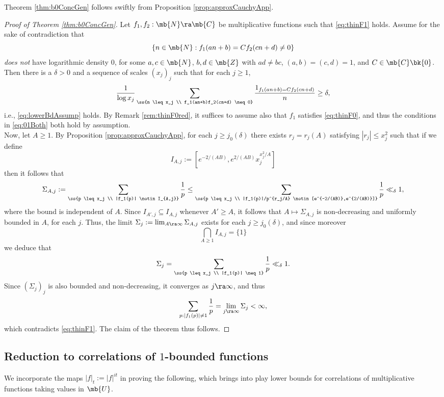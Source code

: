 Theorem \ref{thm:b0ConcGen} follows swiftly from Proposition \ref{prop:approxCauchyApp}.
\begin{proof}[Proof of Theorem \ref{thm:b0ConcGen}]
Let $f_1,f_2: \mb{N} \ra \mb{C}$ be multiplicative functions such that \eqref{eq:thinF1} holds. Assume for the sake of contradiction that
$$
\{n \in \mb{N} : f_1(an+b) = Cf_2(cn+d) \neq 0\}
$$
\emph{does not} have logarithmic density $0$, for some $a,c \in \mb{N}$, $b,d \in \mb{Z}$ with $ad\neq bc$, $(a,b) = (c,d) = 1$, and $C \in \mb{C} \bk \{0\}$. Then there is a $\delta > 0$ and a sequence of scales $(x_j)_j$ such that for each $j \geq 1$,
$$
\frac{1}{\log x_j} \sum_{\ss{n \leq x_j \\ f_1(an+b)f_2(cn+d) \neq 0}} \frac{1_{f_1(an+b) = Cf_2(cn+d)}}{n} \geq \delta,
$$
i.e., \eqref{eq:lowerBdAssump} holds. By Remark \ref{rem:thinF0red}, it suffices to assume also that $f_1$ satisfies \eqref{eq:thinF0}, and thus the conditions in \eqref{eq:01Both} both hold by assumption. \\
Now, let $A \geq 1$. 
%
%
%
%
By Proposition \ref{prop:approxCauchyApp}, for each $j \geq j_0(\delta)$ there exists $r_j  = r_j(A)$ satisfying $|r_j| \leq x_j^2$ such that if we define
$$
I_{A,j} := [e^{-2/(AB)}, e^{2/(AB)} x_j^{x_j^2/A}]
$$
%
then it follows that
$$
\Sigma_{A,j} := \sum_{\ss{p \leq x_j \\ |f_1(p)| \notin I_{A,j}}} \frac{1}{p} \leq \sum_{\ss{p \leq x_j \\ |f_1(p)|/p^{r_j/A} \notin [e^{-2/(AB)},e^{2/(AB)}]}} \frac{1}{p} \ll_{\delta} 1,
%
$$
where the bound is independent of $A$. Since $I_{A',j} \subseteq I_{A,j}$ whenever $A' \geq A$, it follows that $A \mapsto \Sigma_{A,j}$ is non-decreasing and uniformly bounded in $A$, for each $j$. Thus, the limit $\Sigma_j := \lim_{A \ra \infty} \Sigma_{A,j}$ exists for each $j \geq j_0(\delta)$, and since moreover
$$
\bigcap_{A \geq 1} I_{A,j} = \{1\}
$$
we deduce that
$$
\Sigma_j = \sum_{\ss{p \leq x_j \\ |f_1(p)| \neq 1}} \frac{1}{p} \ll_{\delta} 1.
$$
Since $(\Sigma_j)_j$ is also bounded and non-decreasing, it converges as $j \ra \infty$, and thus
$$
\sum_{p : |f_1(p)| \neq 1} \frac{1}{p} = \lim_{j \ra \infty} \Sigma_j < \infty,
$$
%
%
%
%
%
%
%
%
%
%
%
%
%
which contradicts \eqref{eq:thinF1}. The claim of the theorem thus follows.
\end{proof}
%

\subsection{Reduction to correlations of $1$-bounded functions}
We incorporate the maps $|f|_t := |f|^{it}$ in proving the following, which brings into play lower bounds for correlations of multiplicative functions taking values in $\mb{U}$.

